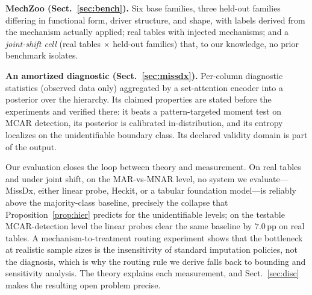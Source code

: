 \documentclass[conference]{IEEEtran}
\begin{document}
\textbf{MechZoo (Sect.~\ref{sec:bench}).} Six base families, three held-out families differing in
functional form, driver structure, and shape, with labels derived from the mechanism actually
applied; real tables with injected mechanisms; and a \emph{joint-shift cell} (real tables
$\times$ held-out families) that, to our knowledge, no prior benchmark isolates.

\textbf{An amortized diagnostic (Sect.~\ref{sec:missdx}).} Per-column diagnostic statistics
(observed data only) aggregated by a set-attention encoder into a posterior over the hierarchy.
Its claimed properties are stated before the experiments and verified there: it beats a
pattern-targeted moment test on MCAR detection, its posterior is calibrated in-distribution,
and its entropy localizes on the unidentifiable boundary class. Its declared validity domain
is part of the output.

Our evaluation closes the loop between theory and measurement. On real tables and under joint
shift, on the MAR-vs-MNAR level, no system we evaluate---MissDx, either linear probe, Heckit,
or a tabular foundation model---is reliably above the majority-class baseline, precisely the
collapse that Proposition~\ref{prop:hier} predicts for the unidentifiable levels; on the
testable MCAR-detection level the linear probes clear the same baseline by $7.0$\,pp on real
tables. A
mechanism-to-treatment routing experiment shows that the bottleneck at realistic sample sizes
is the insensitivity of standard imputation policies, not the diagnosis, which is why the
routing rule we derive falls back to bounding and sensitivity analysis. The theory explains
each measurement, and Sect.~\ref{sec:disc} makes the resulting open problem precise.
\end{document}
